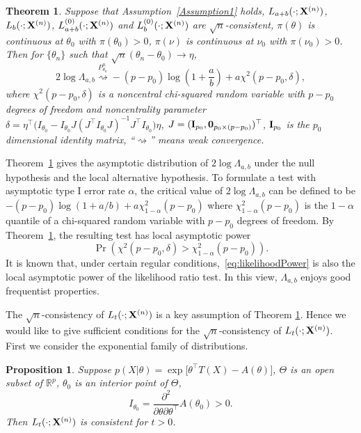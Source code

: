 \documentclass[11pt]{article}
\theoremstyle{plain}
\newtheorem{theorem}{\quad\quad Theorem}
\newtheorem{proposition}{\quad\quad Proposition}
\theoremstyle{definition}
\theoremstyle{remark}
\begin{document}
    \begin{theorem}\label{Thm:maintheorem}
        Suppose that Assumption~\ref{Assumption1} holds, $L_{a+b}(\cdot;\mathbf{X}^{(n)})$, $L_b(\cdot;\mathbf{X}^{(n)})$, $L_{a+b}^{(0)}(\cdot;\mathbf{X}^{(n)})$ and $L_b^{(0)}(\cdot;\mathbf{X}^{(n)})$ are $\sqrt{n}$-consistent, $\pi(\theta)$ is continuous at $\theta_0$ with $\pi(\theta_0)>0$, $\pi(\nu)$ is continuous at $\nu_0$ with $\pi(\nu_0)>0$. Then for $\{\theta_n\}$ such that $\sqrt{n}(\theta_n-\theta_0)\to \eta$, 
        $$
        2\log \Lambda_{a,b}\overset{P^n_{\theta_n}}{\rightsquigarrow}-{(p-p_0)}\log (1+\frac{a}{b})+{a}\chi^2(p-p_0,\delta),
        $$
        where $\chi^2(p-p_0,\delta)$ is a noncentral chi-squared random variable with $p-p_0$ degrees of freedom and noncentrality parameter $\delta=\eta^\top \big( I_{\theta_0}-I_{\theta_0} J(J^\top  I_{\theta_0} J)^{-1}J^\top  I_{\theta_0}\big)\eta$, $J=(\mathbf{I}_{p_0},\mathbf{0}_{p_0\times(p-p_0)})^\top $, $\mathbf{I}_{p_0}$ is the $p_0$ dimensional identity matrix,
``$\rightsquigarrow$'' means weak convergence.
    \end{theorem}
Theorem~\ref{Thm:maintheorem} gives the asymptotic distribution of $2\log \Lambda_{a,b}$ under the null hypothesis and the local alternative hypothesis.
To formulate a test with asymptotic type I error rate $\alpha$, the critical value of $2\log \Lambda_{a,b}$ can be defined to be $-(p-p_0)\log (1+a/b)+ a\chi^2_{1-\alpha}(p-p_0)$ where $\chi^2_{1-\alpha}(p-p_0)$ is the $1-\alpha$ quantile of a chi-squared random variable with $p-p_0$ degrees of freedom.
By Theorem~\ref{Thm:maintheorem}, the resulting test has local asymptotic power
\begin{equation}\label{eq:likelihoodPower}
\Pr \left( \chi^2(p-p_0,\delta)> \chi^2_{1-\alpha}(p-p_0) \right).
\end{equation}
It is known that, under certain regular conditions,~\eqref{eq:likelihoodPower} is also the local asymptotic power of the likelihood ratio test. 
In this view, $\Lambda_{a,b}$ enjoys good frequentist properties.


 The $\sqrt{n}$-consistency of $L_t(\cdot;\mathbf{X}^{(n)})$ is a key assumption of Theorem \ref{Thm:maintheorem}.
Hence we would like to give sufficient conditions for the $\sqrt{n}$-consistency of $L_t(\cdot;\mathbf{X}^{(n)})$.
 First we consider the exponential family of distributions.
\begin{proposition}\label{exponentialCon}
    Suppose $p(X|\theta)=\exp\big[\theta^\top  T(X)-A(\theta)\big]$, $\Theta$ is an open subset of $\mathbb{R}^p$, $\theta_0$ is an interior point of $\Theta$, 
    $$I_{\theta_0}=\frac{\partial^2}{\partial \theta \partial \theta^\top } A(\theta_0)>0.$$
    Then $L_{t}(\cdot;\mathbf{X}^{(n)})$ is consistent for $t>0$.
\end{proposition}
\end{document}
